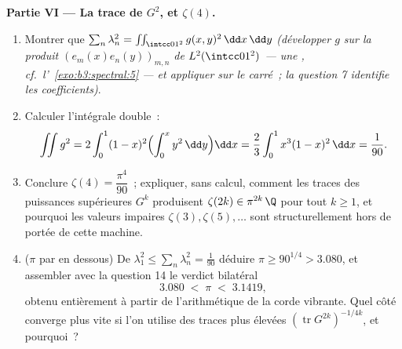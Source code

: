 \begin{problem}
\medskip
\noindent\textbf{Partie VI --- La trace de $G^2$, et
$\zeta(4)$.}
\begin{enumerate}[resume]
  \item Montrer que $\sum_n\lambda_n^2 =
        \iint_{\intcc01^2}g(x,y)^2\,\dd x\,\dd y$
        \emph{(développer $g$ sur la  produit
        $(e_m(x)e_n(y))_{m,n}$ de $L^2(\intcc01^2)$ --- une
        , cf.\ l'~\cref{exo:b3:spectral:5} ---
        et appliquer  sur le carré~; la question 7
        identifie les coefficients)}.
  \item Calculer l'intégrale double~:
        \[
        \iint g^2 = 2\int_0^1(1-x)^2\Bigl(\int_0^x
        y^2\,\dd y\Bigr)\dd x
        = \frac23\int_0^1x^3(1-x)^2\,\dd x = \frac1{90} .
        \]
  \item Conclure $\zeta(4) = \dfrac{\pi^4}{90}$~; expliquer,
        sans calcul, comment les traces des puissances
        supérieures $G^k$ produisent $\zeta(2k) \in
        \pi^{2k}\,\Q$ pour tout $k \geq 1$, et pourquoi les
        valeurs impaires $\zeta(3), \zeta(5), \dots$ sont
        structurellement hors de portée de cette machine.
  \item ($\pi$ par en dessous) De $\lambda_1^2 \leq
        \sum_n\lambda_n^2 = \frac1{90}$ déduire $\pi \geq
        90^{1/4} > 3.080$, et assembler avec la question 14
        le verdict bilatéral
        \[
        3.080 \;<\; \pi \;<\; 3.1419,
        \]
        obtenu entièrement à partir de l'arithmétique de la
        corde vibrante. Quel côté converge plus vite si l'on
        utilise des traces plus élevées
        $(\operatorname{tr}G^{2k})^{-1/4k}$, et pourquoi~?
\end{enumerate}


\end{problem}
